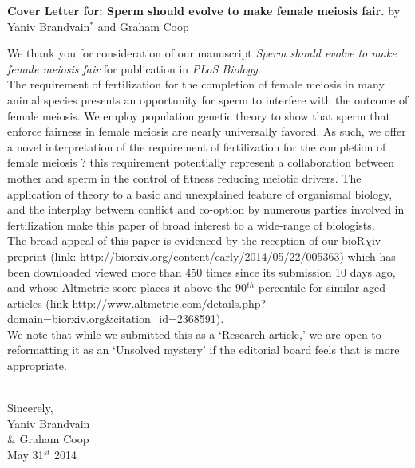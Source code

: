 \documentclass[10pt]{article}
\date{}
\begin{document}
\begin{flushleft}
\textbf{Cover Letter for: Sperm should evolve to make female meiosis fair.}
\newline by Yaniv Brandvain$^{\ast}$ and  Graham Coop \\

\end{flushleft}

We thank you for consideration of our manuscript \emph{Sperm should evolve to make female meiosis fair} for publication in \emph{PLoS Biology}. 
\\ 

The requirement of fertilization for the completion of female meiosis in many animal species presents an opportunity for sperm to interfere with the outcome of female meiosis. We employ population genetic theory to show that sperm that enforce fairness in female meiosis are nearly universally favored. As such, we offer a novel interpretation of the requirement of fertilization for the completion of female meiosis ? this requirement potentially represent a collaboration between mother and sperm in the control of fitness reducing meiotic drivers. The application of theory to a basic and unexplained feature of organismal biology, and the interplay between conflict and co-option by numerous parties involved in fertilization make this paper of broad interest to a wide-range of biologists.
\\

The broad appeal of this paper is evidenced by the reception of our bioR$\chi$iv -- preprint (link: http://biorxiv.org/content/early/2014/05/22/005363) which has been downloaded viewed more than 450 times since its submission 10 days ago, and whose Altmetric score places it above the 90$^{th}$ percentile for similar aged articles (link http://www.altmetric.com/details.php?domain=biorxiv.org\&citation\_id=2368591).
\\

We note that while we submitted this as a `Research article,' we are open to reformatting it as an `Unsolved mystery' if the editorial board feels that is more appropriate. 
\\
\\ 
\begin{flushright}
Sincerely,\\
Yaniv Brandvain \\ \& Graham Coop\\
May 31$^{st}$ 2014
\end{flushright}
\end{document}
